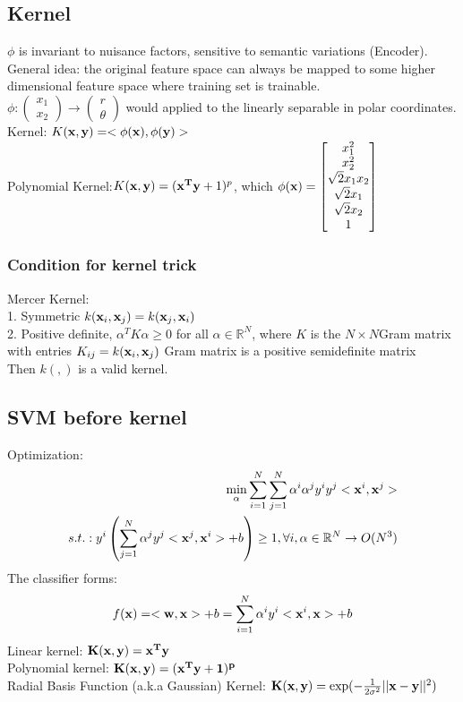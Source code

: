 \documentclass[12pt,a4paper]{article}
\begin{document}
\subsection*{Kernel}
$\phi$ is invariant to nuisance factors, sensitive to semantic variations (Encoder).\\
General idea: the original feature space can always be mapped  to some higher dimensional feature space where training set is trainable.\\
$\phi: \left(\begin{matrix}x_1\\x_2\end{matrix}\right)\rightarrow \left(\begin{matrix}r\\\theta\end{matrix}\right)$ would applied to the linearly separable in polar coordinates.\\
Kernel: $K({\bf x,y})= <\phi({\bf x}),\phi({\bf y})>$\\
Polynomial Kernel:$K({\bf x,y})=({\bf x^Ty}+1)^p$, which $\phi({\bf x}) = \left[\begin{matrix}
x_1^2\\x_2^2\\ \sqrt2x_1x_2 \\ \sqrt2x_1 \\ \sqrt2x_2 \\ 1
\end{matrix}\right]$\\
\subsubsection*{Condition for kernel trick}
Mercer Kernel:\\
1. Symmetric $k({\bf x}_i,{\bf x}_j) = k({\bf x}_j,{\bf x}_i)$\\
2. Positive definite, $\alpha^TK\alpha\ge0$ for all $\alpha \in \mathbb{R}^N$, where $K$ is the $N\times N$Gram matrix with entries $K_{ij}=k({\bf x}_i,{\bf x}_j)$ Gram matrix is a positive semidefinite matrix\\
Then $k(,)$ is a valid kernel.
\subsection*{SVM before kernel}
Optimization:
\begin{eqnarray*}
\min_\alpha\sum_{i=1}^N\sum_{j=1}^N\alpha^i\alpha^jy^iy^j<{\bf x}^i,{\bf x}^j>\\
s.t.: y^i\left(\sum_{j=1}^N\alpha^jy^j<{\bf x}^j,{\bf x}^i>+b\right)\ge 1, \forall i, {\bf \alpha}\in \mathbb{R}^N\rightarrow O(N^3)
\end{eqnarray*}
The classifier forms:
$$
f({\bf x}) = <{\bf w},{\bf x}>+b = \sum_{i=1}^N\alpha^iy^i<{\bf x}^i,{\bf x}>+b
$$
Linear kernel: $\bf K(x,y)=x^Ty$\\
Polynomial kernel: $\bf K(x,y) = (x^Ty+1)^p$\\
Radial Basis Function (a.k.a Gaussian) Kernel: ${\bf K(x,y)} = \exp(-\frac{1}{2\sigma^2}||{\bf x-y}||^2)$ \\
\end{document}
